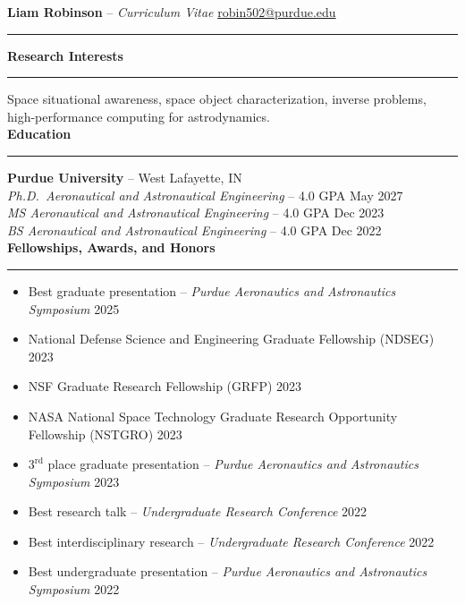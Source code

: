 \documentclass[10pt, a4paper]{article}
\newcommand{\sectiontitle}[1]{{\Large \textbf{#1}}\vspace{0.5em}\hrule\vspace{0.5em}}
\begin{document}
\thispagestyle{empty}



\noindent
\textbf{\huge Liam Robinson }{\huge -- }\textit{\huge Curriculum Vitae} \hfill \href{mailto:robin502@purdue.edu}{robin502@purdue.edu}
\rule{\linewidth}{4pt}
\vspace{-0.5em}

\sectiontitle{Research Interests}

Space situational awareness, space object characterization, inverse problems, high-performance computing for astrodynamics. \\

\sectiontitle{Education}
\textbf{Purdue University} -- West Lafayette, IN \\
\textit{Ph.D.\ Aeronautical and Astronautical Engineering} -- 4.0 GPA \hfill May 2027 \\
\textit{MS Aeronautical and Astronautical Engineering} -- 4.0 GPA \hfill Dec 2023 \\
\textit{BS Aeronautical and Astronautical Engineering} -- 4.0 GPA \hfill Dec 2022 \\

\sectiontitle{Fellowships, Awards, and Honors}
\begin{itemize}[noitemsep]
    \item Best graduate presentation -- \textit{Purdue Aeronautics and Astronautics Symposium} \hfill 2025
    \item National Defense Science and Engineering Graduate Fellowship (NDSEG) \hfill 2023
    \item NSF Graduate Research Fellowship (GRFP) \hfill 2023
    \item NASA National Space Technology Graduate Research Opportunity Fellowship (NSTGRO) \hfill 2023
    \item $3^\text{rd}$ place graduate presentation -- \textit{Purdue Aeronautics and Astronautics Symposium} \hfill 2023
    \item Best research talk -- \textit{Undergraduate Research Conference} \hfill 2022
    \item Best interdisciplinary research -- \textit{Undergraduate Research Conference} \hfill 2022
    \item Best undergraduate presentation -- \textit{Purdue Aeronautics and Astronautics Symposium} \hfill 2022
\end{itemize}
\end{document}
